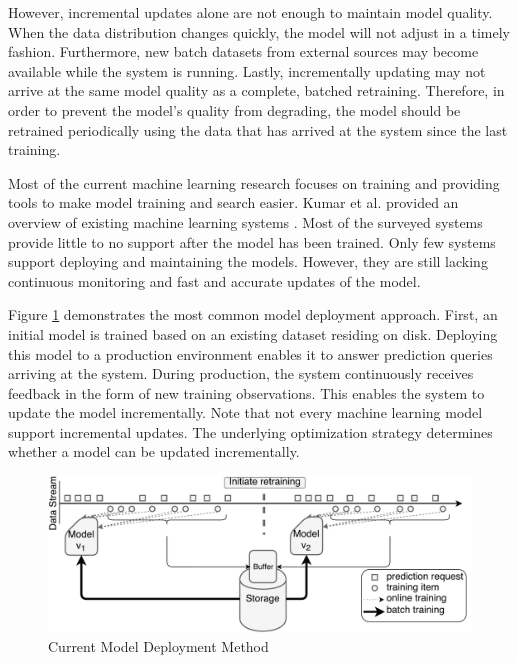 \documentclass{vldb}
\begin{document}
However, incremental updates alone are not enough to maintain model quality. 
When the data distribution changes quickly, the model will not adjust in a timely fashion. 
Furthermore, new batch datasets from external sources may become available while the system is running.
Lastly, incrementally updating may not arrive at the same model quality as a complete, batched retraining.
Therefore, in order to prevent the model's quality from degrading, the model should be retrained periodically using the data that has arrived at the system since the last training.

Most of the current machine learning research focuses on training and providing tools to make model training and search easier. 
Kumar et al. provided an overview of existing machine learning systems \cite{kumar2015survey}. 
Most of the surveyed systems provide little to no support after the model has been trained.
Only few systems \cite{akdere2011case, crankshaw2014missing} support deploying and maintaining the models.
However, they are still lacking continuous monitoring and fast and accurate updates of the model.

Figure \ref{fig:velox-work-flow} demonstrates the most common model deployment approach.
First, an initial model is trained based on an existing dataset residing on disk.
Deploying this model to a production environment enables it to answer prediction queries arriving at the system.
During production, the system continuously receives feedback in the form of new training observations.
This enables the system to update the model incrementally.
Note that not every machine learning model support incremental updates.
The underlying optimization strategy determines whether a model can be updated incrementally.

\begin{figure}[t]
\centering
\includegraphics[width=1\columnwidth]{../images/velox-final.pdf}
\caption{Current Model Deployment Method}
\label{fig:velox-work-flow}
\end{figure}
\end{document}
